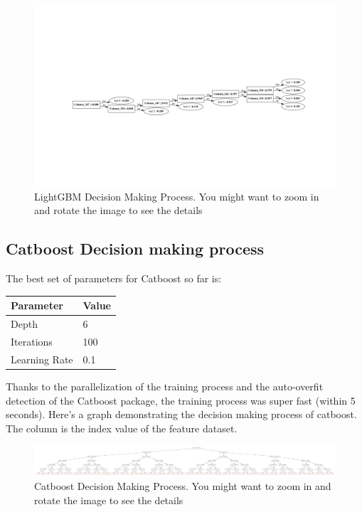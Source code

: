 \documentclass[10pt,letterpaper]{article}
\begin{document}
\newpage
\begin{figure}[H]
    \centering
    \includegraphics[width=\paperwidth, angle=270]{plots/lgbm_tree.pdf}
    \caption{LightGBM Decision Making Process. You might want to zoom in and rotate the image to see the details}
    \label{fig:catboost-decision}
\end{figure}

\subsection{Catboost Decision making process}
The best set of parameters for Catboost so far is:

\begin{table}[H]
\centering
\begin{tabular}{ll}
\textbf{Parameter} & \textbf{Value} \\
\hline
Depth & 6 \\
Iterations & 100 \\
Learning Rate & 0.1 \\
\end{tabular}
\end{table}
Thanks to the parallelization of the training process and the auto-overfit detection of the Catboost package, the training process was super fast (within 5 seconds). Here's a graph demonstrating the decision making process of catboost. The column is the index value of the feature dataset.

\newpage
\begin{figure}[H]
    \centering
    \includegraphics[width=\paperwidth, angle=270]{plots/catboost_tree.pdf}
    \caption{Catboost Decision Making Process. You might want to zoom in and rotate the image to see the details}
    \label{fig:catboost-decision}
\end{figure}
\end{document}
